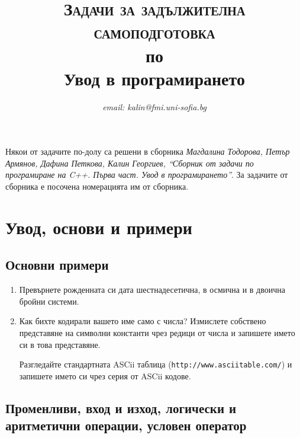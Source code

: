 \documentclass[12pt,a4paper]{article}
\author{\textit{email: kalin@fmi.uni-sofia.bg}}
\title{\textsc{Задачи за задължителна самоподготовка} \\
по \\
Увод в програмирането}
\newcommand{\code}[1]{\texttt{#1}}
\begin{document}
\maketitle

\tableofcontents

\pagebreak

\small{Някои от задачите по-долу са решени в сборника \cite{sbornik}\textit{Магдалина Тодорова, Петър Армянов, Дафина Петкова, Калин Георгиев, ``Сборник от задачи по програмиране на C++. Първа част. Увод в програмирането''}. За задачите от сборника е посочена номерацията им от сборника.}

\pagebreak


\section {Увод, основи и примери}

\subsection {Основни примери}

\begin{enumerate}

	\item Превърнете рожденната си дата шестнадесетична, в осмична и в двоична бройни системи.

	\item Как бихте кодирали вашето име само с числа? Измислете собствено представяне на символни константи чрез редици от числа и запишете името си в това представяне.

	Разгледайте стандартната ASCii таблица (\code{http://www.asciitable.com/}) и запишете името си чрез серия от ASCii кодове.

\end{enumerate}

\subsection {Променливи, вход и изход, логически и аритметични операции, условен оператор}
\end{document}
